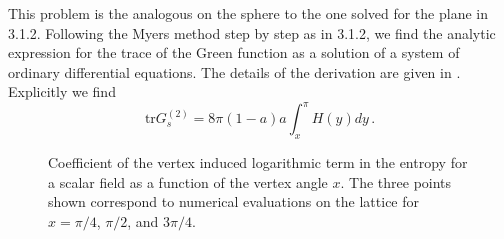 \documentclass[11pt]{article}
\begin{document}
 This problem is the analogous on the sphere to the one solved for the plane in 3.1.2.
 Following the Myers method step by step as in 3.1.2,  we find the analytic expression for the trace of the Green function as a solution of a system of ordinary differential equations. The details of the derivation are given in \cite{log}. Explicitly we find   
\begin{equation}
\textrm{tr}G_s^{(2)}=8\pi (1-a)a\int_{x}^{\pi}H(y)dy\,.\label{quince}
\end{equation}

 \begin{figure} [tb]
\centering
\leavevmode
\epsfysize=5.3cm
\bigskip
{}
\caption{Coefficient of the vertex induced logarithmic term in the entropy for a scalar field as a function of the vertex angle $x$. The three points shown correspond to numerical evaluations on the lattice for $x=\pi/4$, $\pi/2$, and $3 \pi/4$.}
\label{ryry}
\end{figure}
 
\end{document}
